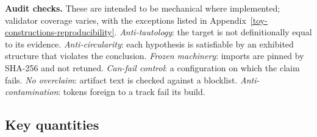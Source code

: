\documentclass[11pt]{article}
\theoremstyle{definition}
\begin{document}
\textbf{Audit checks.} These are intended to be mechanical where implemented; validator coverage varies, with the
exceptions listed in Appendix~\ref{toy-constructions-reproducibility}. \emph{Anti-tautology}: the target is not
definitionally equal to its evidence. \emph{Anti-circularity}: each hypothesis is satisfiable by an exhibited structure
that violates the conclusion. \emph{Frozen machinery}: imports are pinned by SHA-256 and not retuned.
\emph{Can-fail control}: a configuration on which the claim fails. \emph{No overclaim}: artifact text is checked
against a blocklist. \emph{Anti-contamination}: tokens foreign to a track fail its build.

\subsection{Key quantities}\label{the-key-derived-quantities-of-the-body}
\end{document}
